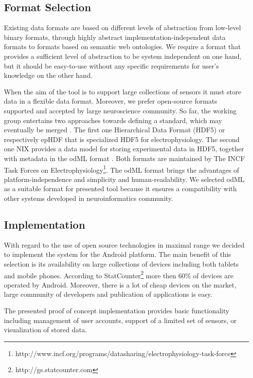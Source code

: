 \documentclass[a4paper,twoside]{article}
\begin{document}
\subsection{Format Selection}

Existing data formats are based on different levels of abstraction from low-level binary formats, through highly abstract implementation-independent data formats to formats based on semantic web ontologies. We require a format that provides a sufficient level of abstraction to be system independent on one hand, but it should be easy-to-use without any specific requirements for user's knowledge on the other hand.

When the aim of the tool is to support large collections of sensors it must store data in a flexible data format. Moreover, we prefer open-source formats supported and accepted by large neuroscience community. So far, the working group entertains two approaches towards defining a standard, which may eventually be merged \cite{10.3389/conf.fninf.2013.09.00069}. The first one Hierarchical Data Format (HDF5) \cite{hdf5} or respectively epHDF that is specialized HDF5 for electrophysiology. The second one NIX \cite{Stoewer:2014}  provides a data model for storing experimental data in HDF5, together with metadata in the odML format \cite{10.3389/fninf.2011.00016}. Both formats are maintained by The INCF Task Forces on Electrophysiology\footnote{http://www.incf.org/programs/datasharing/electrophysiology-task-force}. The odML format brings the advantages of platform-independence and simplicity and human-readability. We selected odML as a suitable format for presented tool because it ensures a compatibility with other systems developed in neuroinformatics community.

\subsection{Implementation}

With regard to the use of open source technologies in maximal range we decided to implement the system for the Android platform. The main benefit of this selection is its availability on large collections of devices including both tablets and mobile phones. According to StatCounter\footnote{http://gs.statcounter.com} more then 60\% of devices are operated by Android.   Moreover, there is a lot of cheap devices on the market, large community of developers and publication of applications is easy. 

The presented proof of concept implementation provides basic functionality including management of user accounts,  support of a limited set of sensors, or visualization of stored data.
\end{document}
